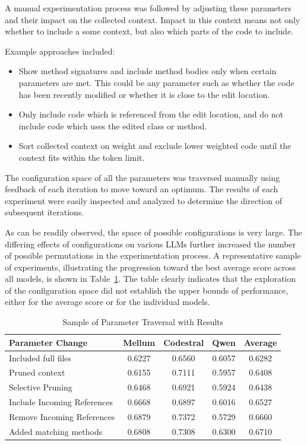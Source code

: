 \documentclass[conference]{IEEEtran}
\begin{document}
A manual experimentation process was followed by adjusting these parameters and their impact on the collected context. 
Impact in this context means not only whether to include a some context, but also which parts of the code to include.

Example approaches included:
\begin{itemize}
    \item Show method signatures and include method bodies only when certain parameters are met.  This could be any parameter such as whether the code has been recently modified or whether it is close to the edit location.
    \item Only include code which is referenced from the edit location, and do not include code which uses the edited class or method.
    \item Sort collected context on weight and exclude lower weighted code until the context fits within the token limit.
       
\end{itemize}

The configuration space of all the parameters was traversed manually using feedback of each iteration to move toward an optimum. 
The results of each experiment were easily inspected and analyzed to determine the direction of subsequent iterations. 


As can be readily observed, the space of possible configurations is very large.
 The differing effects of configurations on various LLMs further increased the number of possible permutations in 
 the experimentation process. A representative sample of experiments, illustrating the progression toward the best average score across all
  models, is shown in Table~\ref{tab:results}. The table clearly indicates that the exploration 
of the configuration space did not establish the upper bounds of performance, either for the average score or for the individual models.


\begin{table}[htbp]
\caption{Sample of Parameter Traversal with Results}
\centering
\begin{tabular}{|p{3.5cm}|c|c|c|c|}
\hline
\textbf{Parameter Change} & \textbf{Mellum} & \textbf{Codestral} & \textbf{Qwen} & \textbf{Average}  \\
\hline
Included full files & 0.6227 & 0.6560 & 0.6057 & 0.6282  \\
\hline
Pruned context & 0.6155 & 0.7111 & 0.5957 & 0.6408  \\
\hline
Selective Pruning & 0.6468 & 0.6921 & 0.5924 & 0.6438  \\
\hline
Include Incoming References & 0.6668 & 0.6897 & 0.6016 & 0.6527  \\
\hline
Remove Incoming References& 0.6879 & 0.7372 & 0.5729 & 0.6660  \\
\hline
Added matching methods & 0.6808 & 0.7308 & 0.6300 & 0.6710  \\
\hline
\end{tabular}
\label{tab:results}
\end{table}
\end{document}
